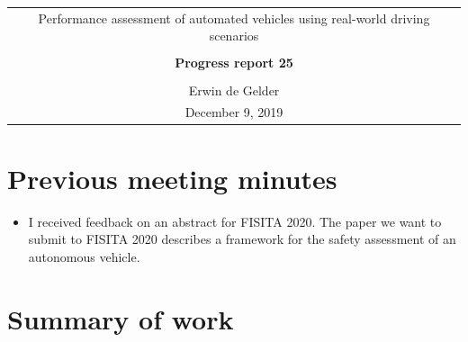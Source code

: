 \documentclass[10pt,final,a4paper,oneside,onecolumn]{article}
\newcommand{\progressreportnumber}{25}
\renewcommand{\author}{Erwin de Gelder}
\renewcommand{\date}{December 9, 2019}
\renewcommand{\title}{Performance assessment of automated vehicles using real-world driving scenarios}
\begin{document}
	
\begin{center}
	\begin{tabular}{c}
		\title \\ \\
		\textbf{\huge Progress report \progressreportnumber} \\ \\
		\author \\ 
		\date
	\end{tabular}
\end{center}

\section{Previous meeting minutes}

\begin{itemize}
	\item I received feedback on an abstract for FISITA 2020. The paper we want to submit to FISITA 2020 describes a framework for the safety assessment of an autonomous vehicle.
\end{itemize}

\section{Summary of work}
\end{document}
